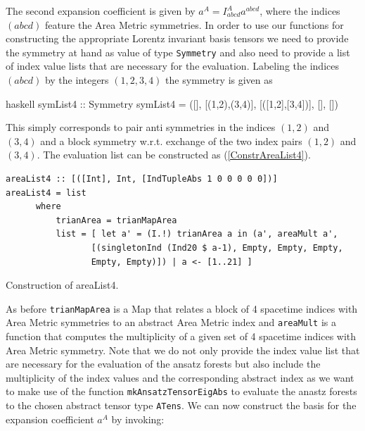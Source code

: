 \documentclass[a4paper,12pt, DIV=14, BCOR=5mm, twoside, headsepline, numbers=noenddot]{scrbook}
\begin{document}
The second expansion coefficient is given by $a^A = I^A_{abcd} a^{abcd}$, where the indices $(abcd)$ feature the Area Metric symmetries. In order to use our functions for constructing the appropriate Lorentz invariant basis tensors we need to provide the symmetry at hand as value of type \texttt{Symmetry} and also need to provide a list of index value lists that are necessary for the evaluation. Labeling the indices $(abcd)$ by the integers $(1,2,3,4)$ the symmetry is given as 

\begin{center}
\begin{cminted}{haskell}
symList4 :: Symmetry
symList4 = ([], [(1,2),(3,4)], [([1,2],[3,4])], [], [])
\end{cminted}
\end{center}

This simply corresponds to pair anti symmetries in the indices $(1,2)$ and $(3,4)$ and a block symmetry w.r.t. exchange of the two index pairs $(1,2)$ and $(3,4)$. The evaluation list can be constructed as (\ref{ConstrAreaList4}).

\begin{listing}[hbt!]
\begin{verbatim}
areaList4 :: [([Int], Int, [IndTupleAbs 1 0 0 0 0 0])]
areaList4 = list
      where
          trianArea = trianMapArea
          list = [ let a' = (I.!) trianArea a in (a', areaMult a',
                 [(singletonInd (Ind20 $ a-1), Empty, Empty, Empty,
                 Empty, Empty)]) | a <- [1..21] ]
\end{verbatim} 
\caption{Construction of areaList4.}\label{ConstrAreaList4}
\end{listing}

As before \texttt{trianMapArea} is a Map that relates a block of 4 spacetime indices with Area Metric symmetries to an abstract Area Metric index and \texttt{areaMult} is a function that computes the multiplicity of a given set of 4 spacetime indices with Area Metric symmetry. Note that we do not only provide the index value list that are necessary for the evaluation of the ansatz forests but also include the multiplicity of the index values and the corresponding abstract index as we want to make use of the function \texttt{mkAnsatzTensorEigAbs} to evaluate the anastz forests to the chosen abstract tensor type \texttt{ATens}. We can now construct the basis for the expansion coefficient $a^{A}$ by invoking:
\end{document}
